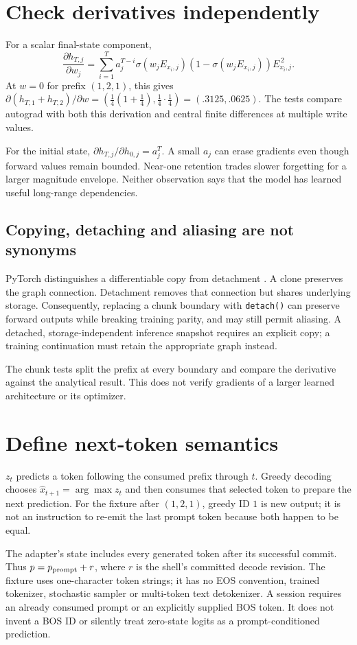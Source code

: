 \section{Check derivatives independently}
For a scalar final-state component,
\[
 \frac{\partial h_{T,j}}{\partial w_j}=
 \sum_{i=1}^{T}a_j^{T-i}
 \sigma(w_jE_{x_i,j})(1-\sigma(w_jE_{x_i,j}))E_{x_i,j}^{\,2}.
\]
At $w=0$ for prefix $(1,2,1)$, this gives
$\partial(h_{T,1}+h_{T,2})/\partial w=
(\tfrac14(1+\tfrac14),\tfrac14\cdot\tfrac14)
=(.3125,.0625)$.
The tests compare autograd with both this derivation and central finite
differences at multiple write values.

For the initial state,
$\partial h_{T,j}/\partial h_{0,j}=a_j^T$.
A small $a_j$ can erase gradients even though forward values remain bounded.
Near-one retention trades slower forgetting for a larger magnitude envelope.
Neither observation says that the model has learned useful long-range
dependencies.

\subsection{Copying, detaching and aliasing are not synonyms}
PyTorch distinguishes a differentiable copy from detachment
\cite{evo31-clone,evo31-detach}. A clone preserves the graph connection.
Detachment removes that connection but shares underlying storage.
Consequently, replacing a chunk boundary with \texttt{detach()} can preserve
forward outputs while breaking training parity, and may still permit aliasing.
A detached, storage-independent inference snapshot requires an explicit copy;
a training continuation must retain the appropriate graph instead.

The chunk tests split the prefix at every boundary and compare the derivative
against the analytical result. This does not verify gradients of a larger
learned architecture or its optimizer.

\section{Define next-token semantics}
$z_t$ predicts a token following the consumed prefix through $t$.
Greedy decoding chooses $\hat x_{t+1}=\arg\max z_t$ and then consumes that
selected token to prepare the next prediction. For the fixture after
$(1,2,1)$, greedy ID $1$ is new output; it is not an instruction to re-emit the
last prompt token because both happen to be equal.

The adapter's state includes every generated token after its successful commit.
Thus $p=p_{\rm prompt}+r$, where $r$ is the shell's committed decode revision.
The fixture uses one-character token strings; it has no EOS convention, trained
tokenizer, stochastic sampler or multi-token text detokenizer.
A session requires an already consumed prompt or an explicitly supplied BOS
token. It does not invent a BOS ID or silently treat zero-state logits as a
prompt-conditioned prediction.

